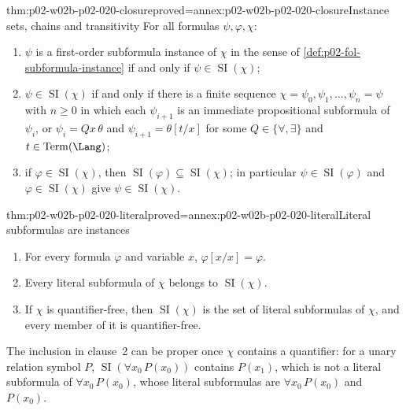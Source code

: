 \begin{hblemma}{thm:p02-w02b-p02-020-closure}{proved=annex:p02-w02b-p02-020-closure}{Instance sets, chains and transitivity}
For all formulas \(\psi,\varphi,\chi\):
\begin{enumerate}
  \item \(\psi\) is a first-order subformula instance of \(\chi\) in the sense
        of \cref{def:p02-fol-subformula-instance} if and only if
        \(\psi\in\operatorname{SI}(\chi)\);
  \item \(\psi\in\operatorname{SI}(\chi)\) if and only if there is a finite
        sequence \(\chi=\psi_0,\psi_1,\ldots,\psi_n=\psi\) with \(n\ge0\) in
        which each \(\psi_{i+1}\) is an immediate propositional subformula of
        \(\psi_i\), or \(\psi_i=Qx\,\theta\) and
        \(\psi_{i+1}=\theta[t/x]\) for some \(Q\in\{\forall,\exists\}\) and
        \(t\in\operatorname{Term}(\Lang)\);
  \item if \(\varphi\in\operatorname{SI}(\chi)\), then
        \(\operatorname{SI}(\varphi)\subseteq\operatorname{SI}(\chi)\); in
        particular \(\psi\in\operatorname{SI}(\varphi)\) and
        \(\varphi\in\operatorname{SI}(\chi)\) give
        \(\psi\in\operatorname{SI}(\chi)\).
\end{enumerate}
\end{hblemma}

\begin{hblemma}{thm:p02-w02b-p02-020-literal}{proved=annex:p02-w02b-p02-020-literal}{Literal subformulas are instances}
\begin{enumerate}
  \item For every formula \(\varphi\) and variable \(x\),
        \(\varphi[x/x]=\varphi\).
  \item Every literal subformula of \(\chi\) belongs to
        \(\operatorname{SI}(\chi)\).
  \item If \(\chi\) is quantifier-free, then \(\operatorname{SI}(\chi)\) is
        the set of literal subformulas of \(\chi\), and every member of it is
        quantifier-free.
\end{enumerate}
\end{hblemma}

The inclusion in clause~2 can be proper once \(\chi\) contains a quantifier:
for a unary relation symbol \(P\),
\(\operatorname{SI}(\forall x_0\,P(x_0))\) contains \(P(x_1)\), which is not a
literal subformula of \(\forall x_0\,P(x_0)\), whose literal subformulas are
\(\forall x_0\,P(x_0)\) and \(P(x_0)\).

